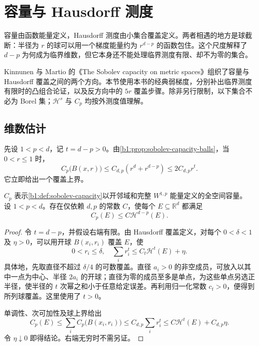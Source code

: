 \section{容量与 Hausdorff 测度}
\label{b1:sec:2603}

容量由函数能量定义，Hausdorff 测度由小集合覆盖定义。两者相遇的地方是球截断：半径为 \(r\) 的球可以用一个梯度能量约为 \(r^{d-p}\) 的函数包住。这个尺度解释了 \(d-p\) 为何成为临界维数，但它本身还不能处理临界测度有限、却不为零的集合。

\ProseParagraphBreak

Kinnunen 与 Martio 的《The Sobolev capacity on metric spaces》\cite[pp. 380--381, 4.13. Theorem and 4.15. Theorem]{KinnunenMartio1996Capacity}组织了容量与 Hausdorff 覆盖之间的两个方向。本节使用本书的经典弱梯度，分别补出临界测度有限时的凸组合论证，以及反方向中的 \(5r\) 覆盖步骤。除非另行限制，以下集合不必为 Borel 集；\(\mathcal H^s\) 与 \(C_p\) 均按外测度值理解。


\subsection{维数估计}
\label{b1:subsec:260301}

先设 \(1<p<d\)，记 \(t=d-p>0\)。由\cref{b1:prop:sobolev-capacity-balls}，当 \(0<r\leq1\) 时，
\[
 C_p\bigl(B(x,r)\bigr)\leq C_{d,p}(r^d+r^{d-p})
 \leq2C_{d,p}r^t.
\]
它立即给出一个覆盖上界。

\begin{proposition}\label{b1:prop:capacity-hausdorff-upper}
\(C_p\) 表示\cref{b1:def:sobolev-capacity}以开邻域和完整 \(W^{1,p}\) 能量定义的全空间容量。
设 \(1<p<d\)。存在仅依赖 \(d,p\) 的常数 \(C\)，使每个
\(E\subseteq\mathbb R^d\) 都满足
\[
 C_p(E)\leq C\mathcal H^{d-p}(E).
\]
\end{proposition}
\begin{proof}
令 \(t=d-p\)，并假设右端有限。由 Hausdorff 覆盖定义，对每个
\(0<\delta<1\) 及 \(\eta>0\)，可以用开球 \(B(x_i,r_i)\) 覆盖 \(E\)，使
\begin{equation}\label{b1:eq:critical-hausdorff-ball-cover}
 0<r_i\leq\delta,\quad
 \sum_i r_i^t\leq C_t\mathcal H^t(E)+\eta.
\end{equation}
具体地，先取直径不超过 \(\delta/4\) 的可数覆盖。直径 \(a_i>0\) 的非空成员，可放入以其中一点为中心、半径 \(2a_i\) 的开球；直径为零的成员至多是单点，为这些单点另选正半径，使半径的 \(t\) 次幂之和小于任意给定误差。再利用归一化常数 \(c_t>0\)，便得到所列球覆盖。这里使用了 \(t>0\)。

单调性、次可加性及球上界给出
\[
 C_p(E)\leq\sum_iC_p\bigl(B(x_i,r_i)\bigr)
 \leq C_{d,p}\sum_i r_i^t
 \leq C\mathcal H^t(E)+C_{d,p}\eta.
\]
令 \(\eta\downarrow0\) 即得结论。右端无穷时不需另证。
\end{proof}

